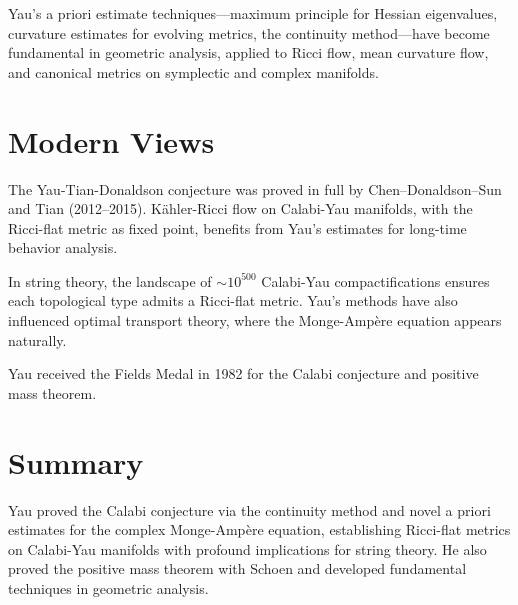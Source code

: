 Yau's a priori estimate techniques---maximum principle for Hessian
eigenvalues, curvature estimates for evolving metrics, the continuity
method---have become fundamental in geometric analysis, applied to Ricci
flow, mean curvature flow, and canonical metrics on symplectic and complex
manifolds.

\section*{Modern Views}

The Yau-Tian-Donaldson conjecture was proved in full by
Chen--Donaldson--Sun and Tian (2012--2015). K\"{a}hler-Ricci flow on
Calabi-Yau manifolds, with the Ricci-flat metric as fixed point, benefits
from Yau's estimates for long-time behavior analysis.

In string theory, the landscape of $\sim 10^{500}$ Calabi-Yau
compactifications ensures each topological type admits a Ricci-flat
metric. Yau's methods have also influenced optimal transport theory,
where the Monge-Amp\`{e}re equation appears naturally.

Yau received the Fields Medal in 1982 for the Calabi conjecture and
positive mass theorem.

\section*{Summary}
Yau proved the Calabi conjecture via the continuity method and novel
a priori estimates for the complex Monge-Amp\`{e}re equation, establishing
Ricci-flat metrics on Calabi-Yau manifolds with profound implications for
string theory. He also proved the positive mass theorem with Schoen and
developed fundamental techniques in geometric analysis.

